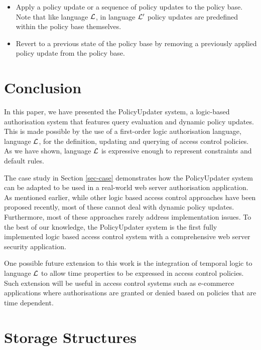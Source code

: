 \documentclass[global,twocolumn,final]{svjour}
\makeatletter
\newcommand{\vappsection}[1]{
  \renewcommand{\@seccntformat}[1]{
    \appendixname\hspace{0.5em}\csname the##1\endcsname \hspace{1em}
  }
  \section{#1}
  \renewcommand{\@seccntformat}[1]{
    \csname the##1\endcsname\hspace{1em}
  }
}
\makeatother
\begin{document}
      \begin{itemize}
        \item
          Apply a policy update or a sequence of policy updates to the policy
          base. Note that like language ${\cal L}$, in language ${\cal L'}$
          policy updates are predefined within the policy base themselves.
        \item
          Revert to a previous state of the policy base by removing a
          previously applied policy update from the policy base.
      \end{itemize}

  \section{Conclusion}
    \label{sec-conclusion}

    In this paper, we have presented the PolicyUpdater system, a logic-based
    authorisation system that features query evaluation and dynamic policy
    updates. This is made possible by the use of a first-order logic
    authorisation language, language ${\cal L}$, for the definition, updating
    and querying of access control policies. As we have shown, language
    ${\cal L}$ is expressive enough to represent constraints and default rules.

    The case study in Section \ref{sec-case} demonstrates how the PolicyUpdater
    system can be adapted to be used in a real-world web server authorisation
    application. As mentioned earlier, while other logic based access control
    approaches have been proposed recently, most of these cannot deal with
    dynamic policy updates. Furthermore, most of these approaches rarely
    address implementation issues. To the best of our knowledge, the
    PolicyUpdater system is the first fully implemented logic based access
    control system with a comprehensive web server security application.

    One possible future extension to this work is the integration of temporal
    logic to language ${\cal L}$ to allow time properties to be expressed in
    access control policies. Such extension will be useful in access control
    systems such as e-commerce applications where authorisations are granted
    or denied based on policies that are time dependent.

  \appendix

  \vappsection{Storage Structures}

    \label{app-store}
\end{document}
